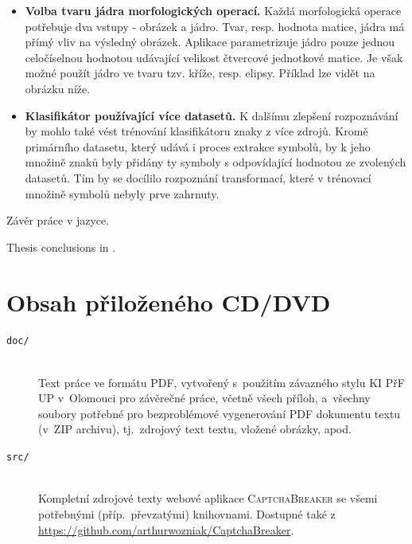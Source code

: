 \documentclass[
  field=ainfp,
  master=true,
  biblatex,
  sourcecodes=false,
  theorems=false,
  glossaries,
  index
]{kidiplom}
\begin{document}
\begin{itemize}
\item \textbf{Volba tvaru jádra morfologických operací.} Každá morfologická operace potřebuje dva vstupy - obrázek a jádro. Tvar, resp. hodnota matice, jádra má přímý vliv na výsledný obrázek. Aplikace parametrizuje jádro pouze jednou celočíselnou hodnotou udávající velikost čtvercové jednotkové matice. Je však možné použít jádro ve tvaru tzv. kříže, resp. elipsy. Příklad lze vidět na obrázku níže.
\item \textbf{Klasifikátor používající více datasetů.} K dalšímu zlepšení rozpoznávání by mohlo také vést trénování klasifikátoru znaky z více zdrojů. Kromě primárního datasetu, který udává i proces extrakce symbolů, by k jeho množině znaků byly přidány ty symboly s odpovídající hodnotou ze zvolených datasetů. Tím by se docílilo rozpoznání transformací, které v trénovací množině symbolů nebyly prve zahrnuty.
\end{itemize}


\begin{kiconclusions}
Závěr práce v  jazyce.
\end{kiconclusions}

\begin{kiconclusions}[english]
Thesis conclusions in .
\end{kiconclusions}

\appendix

\section{Obsah přiloženého CD/DVD} \label{sec:ObsahCD}

\begin{description}

\item[\texttt{doc/}] \hfill \\
  Text práce ve formátu PDF, vytvořený s~použitím závazného stylu KI
  PřF UP v~Olomouci pro závěrečné práce, včetně všech příloh,
  a~všechny soubory potřebné pro bezproblémové vygenerování PDF
  dokumentu textu (v~ZIP archivu), tj.~zdrojový text textu, vložené
  obrázky, apod.

\item[\texttt{src/}] \hfill \\
  Kompletní zdrojové texty webové aplikace \textsc{CaptchaBreaker} se všemi potřebnými (příp.~převzatými) knihovnami. Dostupné také z \url{https://github.com/arthurwozniak/CaptchaBreaker}.

\end{description}
\end{document}
